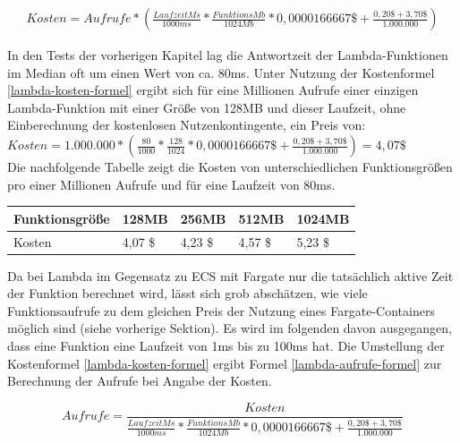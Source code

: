 \begin{equation}
\begin{split}
Kosten = Aufrufe * \left(\frac{LaufzeitMs}{1000ms} * \frac{FunktionsMb}{1024Mb} * 0,0000166667\$ + \frac{0,20\$ + 3,70\$}{1.000.000}\right)
\end{split}
\label{lambda-kosten-formel}
\end{equation}

In den Tests der vorherigen Kapitel lag die Antwortzeit der Lambda-\linebreak Funktionen im Median oft um einen Wert von ca. 80ms. Unter Nutzung der Kostenformel \ref{lambda-kosten-formel} ergibt sich für eine Millionen Aufrufe einer einzigen Lambda-Funktion mit einer Größe von 128MB und dieser Laufzeit, ohne Einberechnung der kostenlosen Nutzenkontingente, ein Preis von: \\

\noindent
$Kosten = 1.000.000 * \left(\frac{80}{1000}*\frac{128}{1024} * 0,0000166667\$ + \frac{0,20\$ + 3,70\$}{1.000.000}\right) = 4,07\$$ \\

Die nachfolgende Tabelle zeigt die Kosten von unterschiedlichen Funktionsgrößen pro einer Millionen Aufrufe und für eine Laufzeit von 80ms.

\begin{table}[H]
\label{lambda-kosten-70ms-1000000aufrufe}
\begin{tabular}{lllll}
\hline
Funktionsgröße & 128MB   & 256MB   & 512MB   & 1024MB  \\ \hline
Kosten         & 4,07 \$ & 4,23 \$ & 4,57 \$ & 5,23 \$ \\ \hline
\end{tabular}
\end{table}

Da bei Lambda im  Gegensatz zu \ac{ECS} mit Fargate nur die tatsächlich aktive Zeit der Funktion berechnet wird, lässt sich grob abschätzen, wie viele Funktionsaufrufe zu dem gleichen Preis der Nutzung eines Fargate-Containers möglich sind (siehe vorherige Sektion). Es wird im folgenden davon ausgegangen, dass eine Funktion eine Laufzeit von 1ms bis zu 100ms hat. Die Umstellung der Kostenformel \ref{lambda-kosten-formel} ergibt Formel \ref{lambda-aufrufe-formel} zur Berechnung der Aufrufe bei Angabe der Kosten.

\begin{equation}
\label{lambda-aufrufe-formel}
Aufrufe = \frac{Kosten}{\frac{LaufzeitMs}{1000ms} * \frac{FunktionsMb}{1024Mb} * 0,0000166667\$ + \frac{0,20\$ + 3,70\$}{1.000.000}}
\end{equation}

